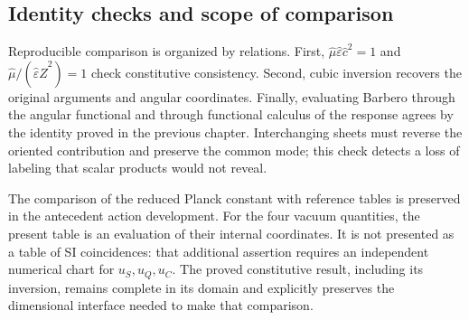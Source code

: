 \subsection{Identity checks and scope of comparison}

Reproducible comparison is organized by relations. First,
$\widehat\mu\widehat\varepsilon\widehat c^2=1$ and
$\widehat\mu/(\widehat\varepsilon\widehat Z^2)=1$ check
constitutive consistency. Second, cubic inversion recovers
the original arguments and angular coordinates. Finally, evaluating
Barbero through the angular functional and through functional calculus
of the response agrees by the identity proved in the previous chapter.
Interchanging sheets must reverse the oriented contribution and preserve
the common mode; this check detects a loss of labeling that scalar
products would not reveal.

The comparison of the reduced Planck constant with reference
tables is preserved in the antecedent action development. For the
four vacuum quantities, the present table is an evaluation of their
internal coordinates. It is not presented as a table of SI coincidences:
that additional assertion requires an independent numerical chart for
$u_S,u_Q,u_C$. The proved constitutive result, including its inversion,
remains complete in its domain and explicitly preserves the dimensional
interface needed to make that comparison.
